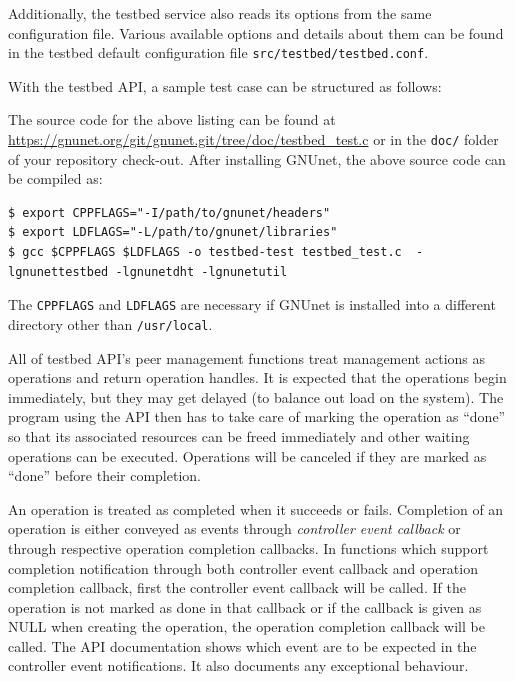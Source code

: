 \documentclass[10pt]{article}
\begin{document}
Additionally, the testbed service also reads its options from the same
configuration file.  Various available options and details about them can be
found in the testbed default configuration file \texttt{src/testbed/testbed.conf}.

With the testbed API, a sample test case can be structured as follows:
\lstset{language=C}

The source code for the above listing can be found at
\url{https://gnunet.org/git/gnunet.git/tree/doc/testbed_test.c}
or in the {\tt doc/} folder of your repository check-out.
After installing GNUnet, the above source code can be compiled as:
\lstset{language=bash}
\begin{lstlisting}
$ export CPPFLAGS="-I/path/to/gnunet/headers"
$ export LDFLAGS="-L/path/to/gnunet/libraries"
$ gcc $CPPFLAGS $LDFLAGS -o testbed-test testbed_test.c  -lgnunettestbed -lgnunetdht -lgnunetutil
\end{lstlisting}
The \texttt{CPPFLAGS} and \texttt{LDFLAGS} are necessary if GNUnet is installed
into a different directory other than \texttt{/usr/local}.

All of testbed API's peer management functions treat management actions as
operations and return operation handles.  It is expected that the operations
begin immediately, but they may get delayed (to balance out load on the system).
The program using the API then has to take care of marking the operation as
``done'' so that its associated resources can be freed immediately and other
waiting operations can be executed.  Operations will be canceled if they are
marked as ``done'' before their completion.

An operation is treated as completed when it succeeds or fails.  Completion of
an operation is either conveyed as events through \textit{controller event
  callback} or through respective operation completion callbacks.  In functions
which support completion notification through both controller event callback and
operation completion callback, first the controller event callback will be
called.  If the operation is not marked as done in that callback or if the
callback is given as NULL when creating the operation, the operation completion
callback will be called.  The API documentation shows which event are to be
expected in the controller event notifications.  It also documents any
exceptional behaviour.
\end{document}
